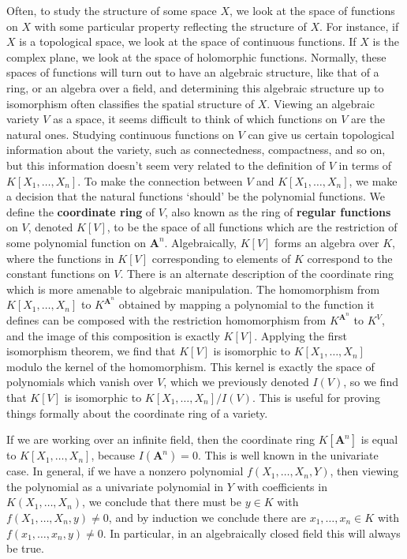 Often, to study the structure of some space $X$, we look at the space of functions on $X$ with some particular property reflecting the structure of $X$. For instance, if $X$ is a topological space, we look at the space of continuous functions. If $X$ is the complex plane, we look at the space of holomorphic functions. Normally, these spaces of functions will turn out to have an algebraic structure, like that of a ring, or an algebra over a field, and determining this algebraic structure up to isomorphism often classifies the spatial structure of $X$. Viewing an algebraic variety $V$ as a space, it seems difficult to think of which functions on $V$ are the natural ones. Studying continuous functions on $V$ can give us certain topological information about the variety, such as connectedness, compactness, and so on, but this information doesn't seem very related to the definition of $V$ in terms of $K[X_1, \dots, X_n]$. To make the connection between $V$ and $K[X_1, \dots, X_n]$, we make a decision that the natural functions `should' be the polynomial functions. We define the {\bf coordinate ring} of $V$, also known as the ring of {\bf regular functions} on $V$, denoted $K[V]$, to be the space of all functions which are the restriction of some polynomial function on $\mathbf{A}^n$. Algebraically, $K[V]$ forms an algebra over $K$, where the functions in $K[V]$ corresponding to elements of $K$ correspond to the constant functions on $V$. There is an alternate description of the coordinate ring which is more amenable to algebraic manipulation. The homomorphism from $K[X_1, \dots, X_n]$ to $K^{\mathbf{A}^n}$ obtained by mapping a polynomial to the function it defines can be composed with the restriction homomorphism from $K^{\mathbf{A}^n}$ to $K^V$, and the image of this composition is exactly $K[V]$. Applying the first isomorphism theorem, we find that $K[V]$ is isomorphic to $K[X_1, \dots, X_n]$ modulo the kernel of the homomorphism. This kernel is exactly the space of polynomials which vanish over $V$, which we previously denoted $I(V)$, so we find that $K[V]$ is isomorphic to $K[X_1, \dots, X_n]/I(V)$. This is useful for proving things formally about the coordinate ring of a variety.

\begin{example}
    If we are working over an infinite field, then the coordinate ring $K[\mathbf{A}^n]$ is equal to $K[X_1, \dots, X_n]$, because $I(\mathbf{A}^n) = 0$. This is well known in the univariate case. In general, if we have a nonzero polynomial $f(X_1, \dots, X_n,Y)$, then viewing the polynomial as a univariate polynomial in $Y$ with coefficients in $K(X_1, \dots, X_n)$, we conclude that there must be $y \in K$ with $f(X_1, \dots, X_n,y) \neq 0$, and by induction we conclude there are $x_1, \dots, x_n \in K$ with $f(x_1, \dots, x_n, y) \neq 0$. In particular, in an algebraically closed field this will always be true.
\end{example}

